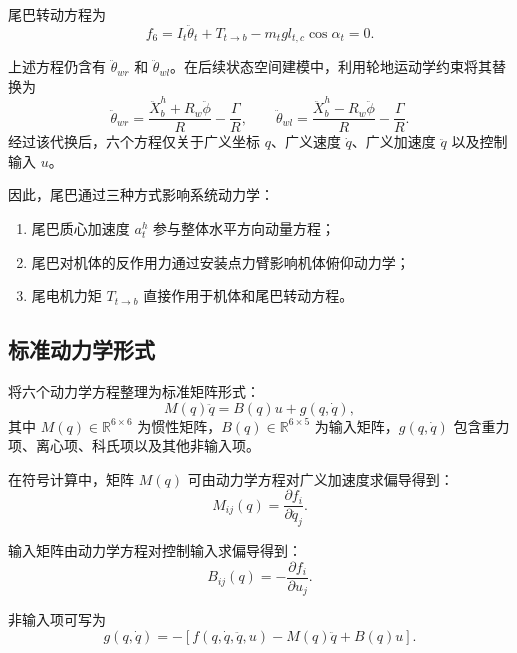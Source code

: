 \documentclass[UTF8,a4paper,12pt]{ctexart}
\begin{document}
尾巴转动方程为
\begin{equation}
    f_6
    =
    I_t\ddot\theta_t
    + T_{t \to b}
    - m_t g l_{t,c}\cos\alpha_t
    = 0.
\end{equation}

上述方程仍含有 $\ddot\theta_{wr}$ 和 $\ddot\theta_{wl}$。在后续状态空间建模中，利用轮地运动学约束将其替换为
\begin{equation}
    \ddot\theta_{wr}
    =
    \frac{\ddot X_b^h + R_w\ddot\phi}{R}
    -
    \frac{\Gamma}{R},
    \qquad
    \ddot\theta_{wl}
    =
    \frac{\ddot X_b^h - R_w\ddot\phi}{R}
    -
    \frac{\Gamma}{R}.
\end{equation}
经过该代换后，六个方程仅关于广义坐标 $q$、广义速度 $\dot q$、广义加速度 $\ddot q$ 以及控制输入 $u$。

因此，尾巴通过三种方式影响系统动力学：

\begin{enumerate}
    \item 尾巴质心加速度 $a_t^h$ 参与整体水平方向动量方程；
    \item 尾巴对机体的反作用力通过安装点力臂影响机体俯仰动力学；
    \item 尾电机力矩 $T_{t \to b}$ 直接作用于机体和尾巴转动方程。
\end{enumerate}

\subsection{标准动力学形式}

将六个动力学方程整理为标准矩阵形式：
\begin{equation}
    M(q)\ddot q = B(q)u + g(q,\dot q),
\end{equation}
其中 $M(q)\in\mathbb{R}^{6\times 6}$ 为惯性矩阵，$B(q)\in\mathbb{R}^{6\times 5}$ 为输入矩阵，$g(q,\dot q)$ 包含重力项、离心项、科氏项以及其他非输入项。

在符号计算中，矩阵 $M(q)$ 可由动力学方程对广义加速度求偏导得到：
\begin{equation}
    M_{ij}(q)
    =
    \frac{\partial f_i}{\partial \ddot q_j}.
\end{equation}

输入矩阵由动力学方程对控制输入求偏导得到：
\begin{equation}
    B_{ij}(q)
    =
    -\frac{\partial f_i}{\partial u_j}.
\end{equation}

非输入项可写为
\begin{equation}
    g(q,\dot q)
    =
    -\left[
        f(q,\dot q,\ddot q,u)
        - M(q)\ddot q
        + B(q)u
    \right].
\end{equation}
\end{document}
